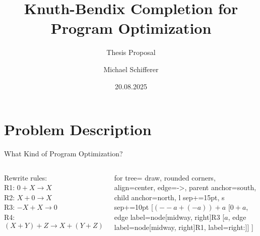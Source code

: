 \documentclass[14pt, aspectratio=169]{beamer}
\title{Knuth-Bendix Completion for\\ Program Optimization}
\subtitle{Thesis Proposal}
\author{Michael Schifferer}
\date{20.08.2025}
\begin{document}
	\maketitle
	
	\section{Problem Description}
	\begin{frame}{What Kind of Program Optimization?}
		\begin{columns}

				Rewrite rules:\\
			R1: $0 + X \rightarrow X$\\
			R2: $X + 0 \rightarrow X$\\
			R3: $-X + X \rightarrow 0$\\
			R4: $(X +Y) + Z \rightarrow X + (Y + Z)$
			
					\begin{minipage}[c][1\textheight][c]{\linewidth}
					\begin{forest}
					for tree={
						draw,                   %
						rounded corners,        %
						align=center,           %
						edge={->},              %
						parent anchor=south,    %
						child anchor=north,     %
						l sep+=15pt,            %
						s sep+=10pt             %
					}
					[$(--a + (-a)) + a$
					[$0 + a$, edge label={node[midway, right]{R3}}
					[$a$, edge label={node[midway, right]{R1}}, label=right:{\textcolor{green}{\checkmark}}]]
					]
				\end{forest}
			\end{minipage}
			\end{columns}
			\end{frame}
\end{document}
